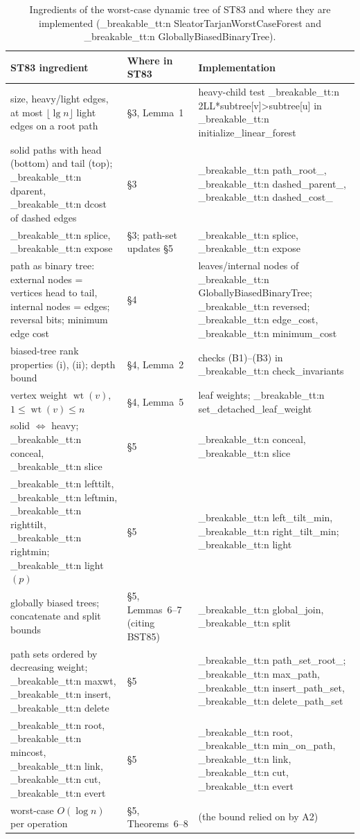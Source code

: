 \documentclass[11pt,a4paper,oneside]{report}
\theoremstyle{plain}
\theoremstyle{definition}
\theoremstyle{remark}
\DeclareRobustCommand{\code}[1]{\mtp_breakable_tt:n {#1}}
\newcommand{\wt}{\operatorname{wt}}
\begin{document}
\begin{table}[ht]
\centering\small
\caption[ST83 ingredients and their implementation]{Ingredients of the worst-case dynamic tree
of ST83 and where they are implemented (\code{SleatorTarjanWorstCaseForest} and
\code{GloballyBiasedBinaryTree}).}\label{tab:st83-map}
\begin{tabularx}{\textwidth}{@{}>{\raggedright\arraybackslash}p{5.2cm}>{\raggedright\arraybackslash}p{1.9cm}X@{}}
\toprule
\textbf{ST83 ingredient} & \textbf{Where in ST83} & \textbf{Implementation}\\
\midrule
size, heavy/light edges, at most \(\lfloor\lg n\rfloor\) light edges on a root path & \S3, Lemma~1 & heavy-child test \code{2LL*subtree[v]>subtree[u]} in \code{initialize_linear_forest}\\
solid paths with head (bottom) and tail (top); \code{dparent}, \code{dcost} of dashed edges & \S3 & \code{path_root_}, \code{dashed_parent_}, \code{dashed_cost_}\\
\code{splice}, \code{expose} & \S3; path-set updates \S5 & \code{splice}, \code{expose}\\
path as binary tree: external nodes = vertices head to tail, internal nodes = edges; reversal bits; minimum edge cost & \S4 & leaves/internal nodes of \code{GloballyBiasedBinaryTree}; \code{reversed}; \code{edge_cost}, \code{minimum_cost}\\
biased-tree rank properties (i), (ii); depth bound & \S4, Lemma~2 & checks (B1)--(B3) in \code{check_invariants}\\
vertex weight \(\wt(v)\), \(1\le\wt(v)\le n\) & \S4, Lemma~5 & leaf weights; \code{set_detached_leaf_weight}\\
solid \(\iff\) heavy; \code{conceal}, \code{slice} & \S5 & \code{conceal}, \code{slice}\\
\code{lefttilt}, \code{leftmin}, \code{righttilt}, \code{rightmin}; \code{light}\((p)\) & \S5 & \code{left_tilt_min}, \code{right_tilt_min}; \code{light}\\
globally biased trees; concatenate and split bounds & \S5, Lemmas~6--7 (citing BST85) & \code{global_join}, \code{split}\\
path sets ordered by decreasing weight; \code{maxwt}, \code{insert}, \code{delete} & \S5 & \code{path_set_root_}; \code{max_path}, \code{insert_path_set}, \code{delete_path_set}\\
\code{root}, \code{mincost}, \code{link}, \code{cut}, \code{evert} & \S5 & \code{root}, \code{min_on_path}, \code{link}, \code{cut}, \code{evert}\\
worst-case \(O(\log n)\) per operation & \S5, Theorems~6--8 & (the bound relied on by A2)\\
\bottomrule
\end{tabularx}
\end{table}
\end{document}
